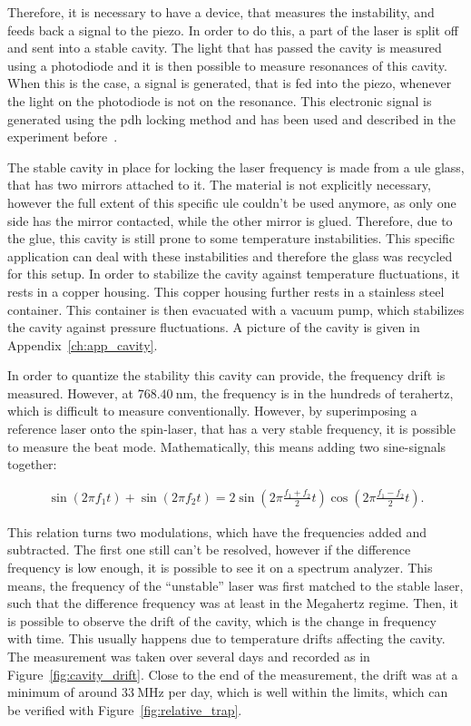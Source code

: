 Therefore, it is necessary to have a device, that measures the instability, and feeds back a signal to the piezo. In order to do this, a part of the laser is split off and sent into a stable cavity. The light that has passed the cavity is measured using a photodiode and it is then possible to measure resonances of this cavity. When this is the case, a signal is generated, that is fed into the piezo, whenever the light on the photodiode is not on the resonance. This electronic signal is generated using the \acl{pdh} locking method and has been used and described in the experiment before~\cite{Hirthe2018}.

The stable cavity in place for locking the laser frequency is made from a \ac{ule} glass, that has two mirrors attached to it. The material is not explicitly necessary, however the full extent of this specific \ac{ule} couldn't be used anymore, as only one side has the mirror contacted, while the other mirror is glued. Therefore, due to the glue, this cavity is still prone to some temperature instabilities. This specific application can deal with these instabilities and therefore the glass was recycled for this setup. In order to stabilize the cavity against temperature fluctuations, it rests in a copper housing. This copper housing further rests in a stainless steel container. This container is then evacuated with a vacuum pump, which stabilizes the cavity against pressure fluctuations. A picture of the cavity is given in Appendix~\ref{ch:app_cavity}.

In order to quantize the stability this cavity can provide, the frequency drift is measured. However, at $\SI{768.40}{\nano\meter}$, the frequency is in the hundreds of terahertz, which is difficult to measure conventionally. However, by superimposing a reference laser onto the spin-laser, that has a very stable frequency, it is possible to measure the beat mode. Mathematically, this means adding two sine-signals together:

\begin{align}
	\sin{\left(2\pi f_1 t\right)} + \sin{\left( 2 \pi f_2 t \right)}
	= 2 \sin{\left( 2\pi \frac{f_1+f_2}{2}t \right)} \cos{\left( 2\pi \frac{f_1-f_2}{2}t \right)}.
\end{align}

This relation turns two modulations, which have the frequencies added and subtracted. The first one still can't be resolved, however if the difference frequency is low enough, it is possible to see it on a spectrum analyzer. This means, the frequency of the ``unstable'' laser was first matched to the stable laser, such that the difference frequency was at least in the Megahertz regime. Then, it is possible to observe the drift of the cavity, which is the change in frequency with time. This usually happens due to temperature drifts affecting the cavity. The measurement was taken over several days and recorded as in Figure~\ref{fig:cavity_drift}. Close to the end of the measurement, the drift was at a minimum of around $\SI{33}{\mega\hertz}$ per day, which is well within the limits, which can be verified with Figure~\ref{fig:relative_trap}.

